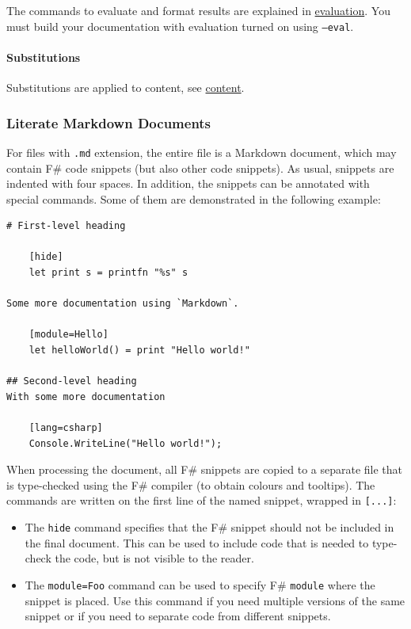 \documentclass{article}
\begin{document}
The commands to evaluate and format results are explained in \href{evaluation.html}{evaluation}.
You must build your documentation with evaluation turned on using \texttt{--eval}.
\paragraph{Substitutions}



Substitutions are applied to content, see \href{content.html}{content}.
\subsubsection*{Literate Markdown Documents}



For files with \texttt{.md} extension, the entire file is a Markdown document, which may
contain F\# code snippets (but also other code snippets). As usual, snippets are
indented with four spaces. In addition, the snippets can be annotated with special
commands. Some of them are demonstrated in the following example:
\begin{lstlisting}
# First-level heading

    [hide]
    let print s = printfn "%s" s

Some more documentation using `Markdown`.

    [module=Hello]
    let helloWorld() = print "Hello world!"

## Second-level heading
With some more documentation

    [lang=csharp]
    Console.WriteLine("Hello world!");

\end{lstlisting}


When processing the document, all F\# snippets are copied to a separate file that
is type-checked using the F\# compiler (to obtain colours and tooltips).
The commands are written on the first line of the named snippet, wrapped in \texttt{[...]}:
\begin{itemize}
\item 

The \texttt{hide} command specifies that the F\# snippet should not be included in the
final document. This can be used to include code that is needed to type-check
the code, but is not visible to the reader.

\end{itemize}

\begin{itemize}
\item 

The \texttt{module=Foo} command can be used to specify F\# \texttt{module} where the snippet
is placed. Use this command if you need multiple versions of the same snippet
or if you need to separate code from different snippets.

\end{itemize}
\end{document}
